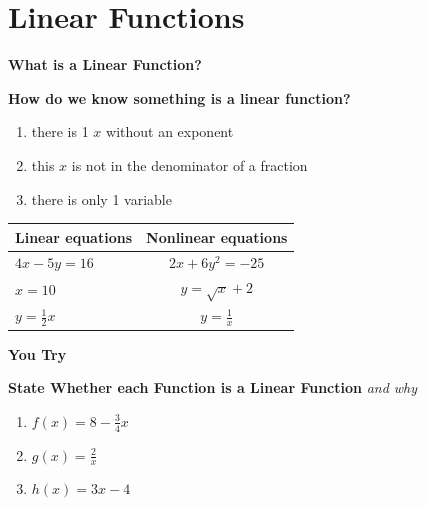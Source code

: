 \documentclass[12pt]{article}
\begin{document}
\pagebreak


\section*{Linear Functions}

\textbf{What is a Linear Function?} \\

\vspace{1in}

\textbf{How do we know something is a linear function?}\\



\begin{enumerate}
\item there is 1 $x$ without an exponent

\item this $x$ is not in the denominator of a fraction

\item there is only 1 variable \\

\end{enumerate}
\begin{center}

\begin{tabular}{ l | c }
  \textbf{Linear equations} & \textbf{Nonlinear equations}  \\ \hline
  $4x-5y=16$ & $2x+6y^2=-25$  \\
  $x=10$ & $y=\sqrt{x}+2$  \\
  $y=\frac{1}{2}x$ & $y=\frac{1}{x}$\\
\end{tabular}
\end{center}

\begin{Large}
\textbf{You Try}
\end{Large}

\textbf{State Whether each Function is a Linear Function} \textit{and why}

\begin{enumerate}
\item $f(x)=8-\frac{3}{4}x$\\

\vspace{1in}

\item $g(x)=\frac{2}{x}$\\

\vspace{1in}

\item $h(x)=3x-4$\\
\end{enumerate}
\end{document}
